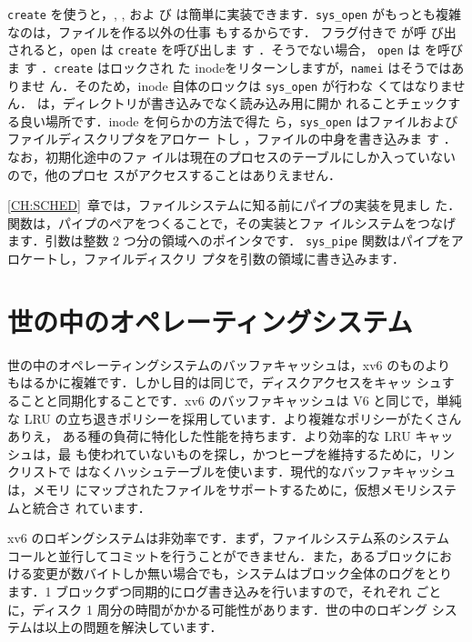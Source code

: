 \texttt{create} を使うと，, , およ
び  は簡単に実装できます．\texttt{sys\_open}
 がもっとも複雑なのは，ファイルを作る以外の仕事
もするからです． フラグ付きで  が呼
び出されると，\texttt{open} は \texttt{create} を呼び出しま
す ．そうでない場合，
\texttt{open} は  を呼びま
す ．\texttt{create} はロックされ
た inodeをリターンしますが，\texttt{namei} はそうではありませ
ん．そのため，inode 自体のロックは \texttt{sys\_open} が行わな
くてはなりません． は，ディレクトリが書き込みでなく読み込み用に開か
れることチェックする良い場所です．inode を何らかの方法で得た
ら，\texttt{sys\_open} はファイルおよびファイルディスクリプタをアロケー
トし ，ファイルの中身を書き込みま
す ．なお，初期化途中のファ
イルは現在のプロセスのテーブルにしか入っていないので，他のプロセ
スがアクセスすることはありえません．


\ref{CH:SCHED}~章では，ファイルシステムに知る前にパイプの実装を見まし
た． 関数は，パイプのペアをつくることで，その実装とファ
イルシステムをつなげます．引数は整数 2 つ分の領域へのポインタです．
\texttt{sys\_pipe} 関数はパイプをアロケートし，ファイルディスクリ
プタを引数の領域に書き込みます．

\section{世の中のオペレーティングシステム}

世の中のオペレーティングシステムのバッファキャッシュは，xv6 のものより
もはるかに複雑です．しかし目的は同じで，ディスクアクセスをキャッ
シュすることと同期化することです．xv6 のバッファキャッシュは V6 
と同じで，単純な LRU 
の立ち退きポリシーを採用しています．より複雑なポリシーがたくさんありえ，
ある種の負荷に特化した性能を持ちます．より効率的な LRU キャッシュは，最
も使われていないものを探し，かつヒープを維持するために，リンクリストで
はなくハッシュテーブルを使います．現代的なバッファキャッシュは，メモリ
にマップされたファイルをサポートするために，仮想メモリシステムと統合さ
れています．

xv6 のロギングシステムは非効率です．まず，ファイルシステム系のシステム
コールと並行してコミットを行うことができません．また，あるブロックにお
ける変更が数バイトしか無い場合でも，システムはブロック全体のログをとり
ます．1 ブロックずつ同期的にログ書き込みを行いますので，それぞれ
ごとに，ディスク 1 周分の時間がかかる可能性があります．世の中のロギング
システムは以上の問題を解決しています．

